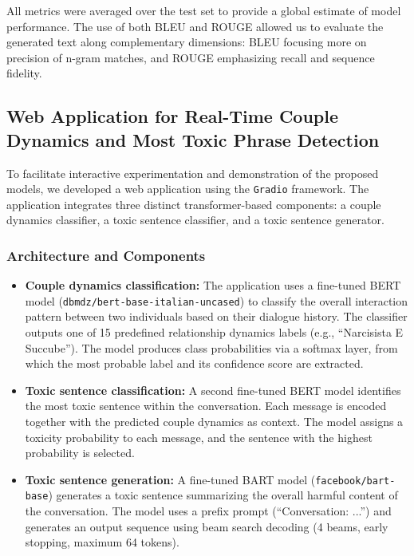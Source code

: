 \documentclass[conference]{IEEEtran}
\begin{document}
All metrics were averaged over the test set to provide a global estimate of model performance. The use of both BLEU and ROUGE allowed us to evaluate the generated text along complementary dimensions: BLEU focusing more on precision of n-gram matches, and ROUGE emphasizing recall and sequence fidelity.

\subsection{Web Application for Real-Time Couple Dynamics and Most Toxic Phrase Detection}

To facilitate interactive experimentation and demonstration of the proposed models, we developed a web application using the \texttt{Gradio} framework. The application integrates three distinct transformer-based components: a couple dynamics classifier, a toxic sentence classifier, and a toxic sentence generator. 

\subsubsection{Architecture and Components}
\begin{itemize}
    \item \textbf{Couple dynamics classification:} The application uses a fine-tuned BERT model (\texttt{dbmdz/bert-base-italian-uncased}) to classify the overall interaction pattern between two individuals based on their dialogue history. The classifier outputs one of 15 predefined relationship dynamics labels (e.g., ``Narcisista E Succube''). The model produces class probabilities via a softmax layer, from which the most probable label and its confidence score are extracted.
    
    \item \textbf{Toxic sentence classification:} A second fine-tuned BERT model identifies the most toxic sentence within the conversation. Each message is encoded together with the predicted couple dynamics as context. The model assigns a toxicity probability to each message, and the sentence with the highest probability is selected.
    
    \item \textbf{Toxic sentence generation:} A fine-tuned BART model (\texttt{facebook/bart-base}) generates a toxic sentence summarizing the overall harmful content of the conversation. The model uses a prefix prompt (``Conversation: ...'') and generates an output sequence using beam search decoding (4 beams, early stopping, maximum 64 tokens).
\end{itemize}
\end{document}

